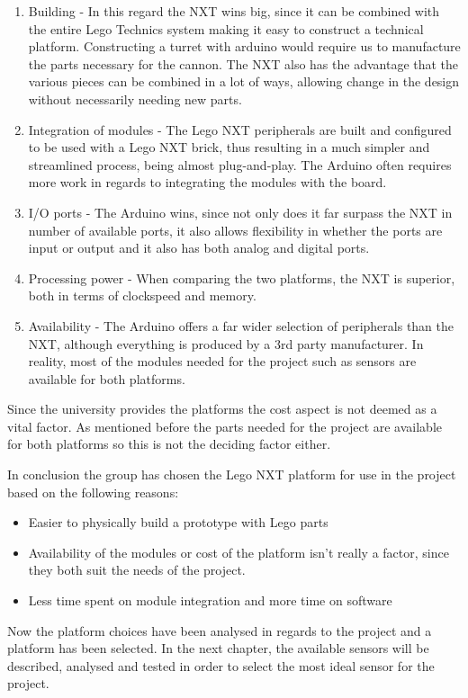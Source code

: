 \begin{enumerate}
  \item Building - In this regard the NXT wins big, since it can be combined
  with the entire Lego Technics system making it easy to construct a
  technical platform. Constructing a turret with arduino would require us to
  manufacture the parts necessary for the cannon. The NXT also has the
  advantage that the various pieces can be combined in a lot of ways, allowing
  change in the design without necessarily needing new parts.
  \item Integration of modules - The Lego NXT peripherals are built and
  configured to be used with a Lego NXT brick, thus resulting in a much simpler
  and streamlined process, being almost plug-and-play. The Arduino often
  requires more work in regards to integrating the modules with the board.
  \item I/O ports - The Arduino wins, since not only does it far surpass
  the NXT in number of available ports, it also allows flexibility in
  whether the ports are input or output and it also has both analog
  and digital ports.
  \item Processing power - When comparing the two platforms, the NXT is
  superior, both in terms of clockspeed and memory.
  \item Availability - The Arduino offers a far wider selection of peripherals
  than the NXT, although everything is produced by a 3rd party manufacturer. In
  reality, most of the modules needed for the project such as sensors are
  available for both platforms.
\end{enumerate}

Since the university provides the platforms the cost aspect is not deemed as a
vital factor. As mentioned before the parts needed for the project are
available for both platforms so this is not the deciding factor either.

In conclusion the group has chosen the Lego NXT platform for use in the project
based on the following reasons:
\begin{itemize}
  \item Easier to physically build a prototype with Lego parts
  \item Availability of the modules or cost of the platform isn't really a
  factor, since they both suit the needs of the project.
  \item Less time spent on module integration and more time on software
\end{itemize}

Now the platform choices have been analysed in regards to the project and a
platform has been selected. In the next chapter, the available sensors will be
described, analysed and tested in order to select the most ideal sensor for the
project.
